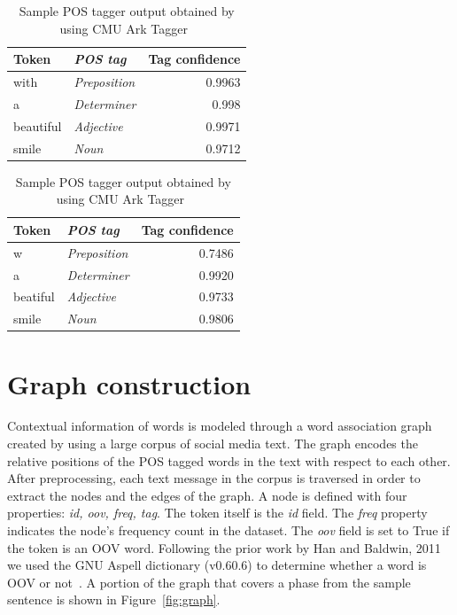 \documentclass[a4paper,onesided,12pt]{report}
\begin{document}
\begin{table}[htbp]
\caption{Sample POS tagger output obtained by using CMU Ark Tagger~\cite{owoputi2013improved,Gimpel:2011:PTT:2002736.2002747}}
\begin{minipage}{.5\linewidth}
\begin{tabular}[h]{|l>{\itshape}lr|}
 \hline
Token & POS tag & Tag confidence \\
 \hline
with & Preposition & 0.9963 \\
 \hline
a & Determiner & 0.998 \\
 \hline
beautiful & Adjective & 0.9971 \\
 \hline
smile & Noun & 0.9712 \\
 \hline
\end{tabular}
\end{minipage}
\begin{minipage}{.5\linewidth}
\begin{tabular}[h]{|l>{\itshape}lr|}
 \hline
Token & POS tag & Tag confidence \\
 \hline
w & Preposition & 0.7486 \\
 \hline
a & Determiner & 0.9920 \\
 \hline
beatiful & Adjective & 0.9733 \\
 \hline
smile & Noun & 0.9806 \\
 \hline
\end{tabular}
\end{minipage}
\label{tab:postags}
\end{table}

\section{Graph construction}

Contextual information of words is modeled through a word association graph created by using a large corpus of social media text. The graph encodes the relative positions of the POS tagged words in the text with respect to each other. After preprocessing, each text message in the corpus is traversed in order to extract the nodes and the edges of the graph.
A node is defined with four properties: \textit{id, oov, freq, tag}. The token itself is the \textit{id} field. The \textit{freq} property indicates the node's frequency count in the dataset. The \textit{oov} field is set to True if the token is an OOV word. Following the prior work by Han and Baldwin, 2011 we used the GNU Aspell dictionary (v0.60.6) to determine whether a word is OOV or not~\cite{Han:2011:LNS:2002472.2002520}. A portion of the graph that covers a phase from the sample sentence is shown in Figure~\ref{fig:graph}.
\end{document}
